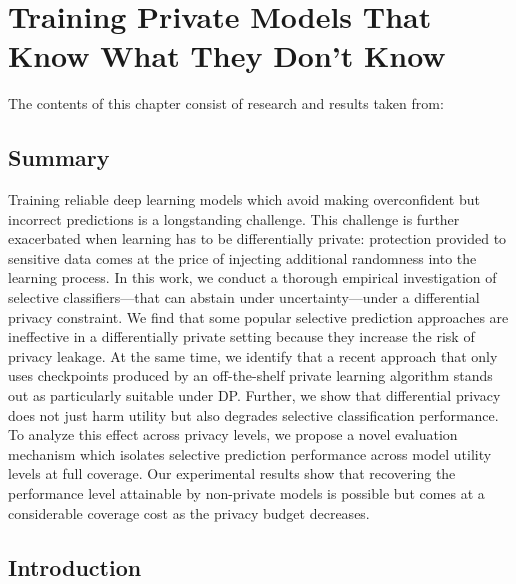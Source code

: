 \chapter{Training Private Models That Know What They Don't Know}
\label{ch:sptd_dp}


\begin{paperref}
\normalfont
The contents of this chapter consist of research and results taken from: \emph{}
\end{paperref}


\section*{Summary}

Training reliable deep learning models which avoid making overconfident but incorrect predictions is a longstanding challenge. This challenge is further exacerbated when learning has to be differentially private: protection provided to sensitive data comes at the price of injecting additional randomness into the learning process. In this work, we conduct a thorough empirical investigation of selective classifiers---that can abstain under uncertainty---under a differential privacy constraint. We find that some popular selective prediction approaches are ineffective in a differentially private setting because they increase the risk of privacy leakage. At the same time, we identify that a recent approach that only uses checkpoints produced by an off-the-shelf private learning algorithm stands out as particularly suitable under DP. Further, we show that differential privacy does not just harm utility but also degrades selective classification performance. To analyze this effect across privacy levels, we propose a novel evaluation mechanism which isolates selective prediction performance across model utility levels at full coverage. Our experimental results show that recovering the performance level attainable by non-private models is possible but comes at a considerable coverage cost as the privacy budget decreases.

\section{Introduction}
\label{sec:intro}

